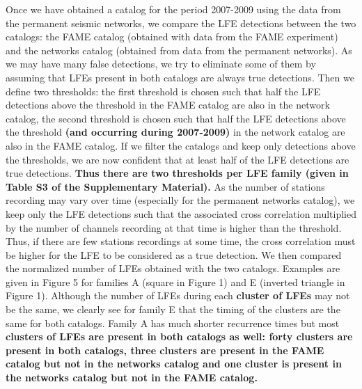 \documentclass[draft]{agujournal2019}
\begin{document}
Once we have obtained a catalog for the period 2007-2009 using the data from the permanent seismic networks, we compare the LFE detections between the two catalogs: the FAME catalog (obtained with data from the FAME experiment) and the networks catalog (obtained from data from the permanent networks). As we may have many false detections, we try to eliminate some of them by assuming that LFEs present in both catalogs are always true detections. Then we define two thresholds: the first threshold is chosen such that half the LFE detections above the threshold in the FAME catalog are also in the network catalog, the second threshold is chosen such that half the LFE detections above the threshold \textbf{(and occurring during 2007-2009)} in the network catalog are also in the FAME catalog. If we filter the catalogs and keep only detections above the thresholds, we are now confident that at least half of the LFE detections are true detections. \textbf{Thus there are two thresholds per LFE family (given in Table S3 of the Supplementary Material).} As the number of stations recording may vary over time (especially for the permanent networks catalog), we keep only the LFE detections such that the associated cross correlation multiplied by the number of channels recording at that time is higher than the threshold. Thus, if there are few stations recordings at some time, the cross correlation must be higher for the LFE to be considered as a true detection. We then compared the normalized number of LFEs obtained with the two catalogs. Examples are given in Figure 5 for families A (square in Figure 1) and E (inverted triangle in Figure 1). Although the number of LFEs during each \textbf{cluster of LFEs} may not be the same, we clearly see for family E that the timing of the clusters are the same for both catalogs. Family A has much shorter recurrence times but most \textbf{clusters of LFEs are present in both catalogs as well: forty clusters are present in both catalogs, three clusters are present in the FAME catalog but not in the networks catalog and one cluster is present in the networks catalog but not in the FAME catalog.} \\
\end{document}
